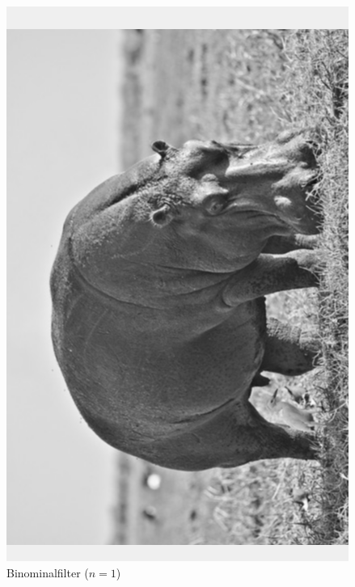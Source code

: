 \documentclass[12pt]{article}
\begin{document}
\begin{figure}[H]
  \centering
  \begin{minipage}{0.49\textwidth}
    \centering
    \includegraphics[width=\textwidth, height=0.4\textheight, keepaspectratio]{binominal_1.png}
    Binominalfilter ($n = 1$)
  \end{minipage}
  \hfill
  \begin{minipage}{0.49\textwidth}
    \centering

\end{minipage}
\end{figure}
\end{document}
